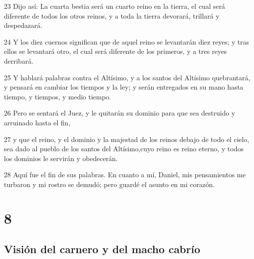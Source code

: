 \par 23 Dijo así: La cuarta bestia será un cuarto reino en la tierra, el cual será diferente de todos los otros reinos, y a toda la tierra devorará, trillará y despedazará.
\par 24 Y los diez cuernos significan que de aquel reino se levantarán diez reyes; y tras ellos se levantará otro, el cual será diferente de los primeros, y a tres reyes derribará.
\par 25 Y hablará palabras contra el Altísimo, y a los santos del Altísimo quebrantará, y pensará en cambiar los tiempos y la ley; y serán entregados en su mano hasta tiempo, y tiempos, y medio tiempo. 
\par 26 Pero se sentará el Juez, y le quitarán su dominio para que sea destruido y arruinado hasta el fin,
\par 27 y que el reino, y el dominio y la majestad de los reinos debajo de todo el cielo, sea dado al pueblo de los santos del Altísimo,cuyo reino es reino eterno, y todos los dominios le servirán y obedecerán.
\par 28 Aquí fue el fin de sus palabras. En cuanto a mí, Daniel, mis pensamientos me turbaron y mi rostro se demudó; pero guardé el asunto en mi corazón.

\chapter{8}

\section*{Visión del carnero y del macho cabrío}

